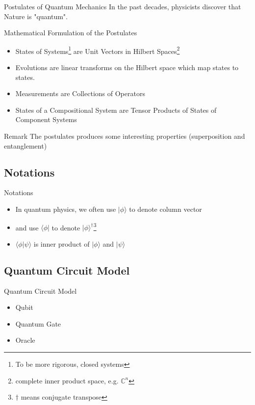 \documentclass{beamer}
\newcommand{\<}{\langle}
\renewcommand{\>}{\rangle}
\begin{document}
\begin{frame}{Postulates of Quantum Mechanics}
In the past decades, physicists discover that Nature is "quantum".

    \begin{block}{Mathematical Formulation of the Postulates}
        \begin{itemize}
            \item States of Systems\footnote[frame]{To be more rigorous, closed systems} are Unit Vectors in Hilbert Spaces\footnote[frame]{complete inner product space, e.g. $\mathbb{C}^n$}
            \item Evolutions are linear transforms on the Hilbert space which map states to states.
            \item Measurements are Collections of Operators
            \item States of a Compositional System are Tensor Products of States of Component Systems
        \end{itemize}
    \end{block}

    \begin{exampleblock}{Remark}
        The postulates produces some interesting properties (superposition and entanglement)
    \end{exampleblock}


\end{frame}

\subsection{Notations}
\begin{frame}{Notations}

\begin{itemize}
    \item  In quantum physics, we often use $|\phi\>$ to denote column vector
    \item and use $\<\phi|$ to denote $|\phi\>^\dagger$\footnote{$\dag$ means conjugate transpose}
    \item $\<\phi|\psi\>$ is inner product of $|\phi\>$ and $|\psi\>$
    
\end{itemize}

\end{frame}

\subsection{Quantum Circuit Model}
\begin{frame}{Quantum Circuit Model}

\begin{itemize}
    \item Qubit
    \item Quantum Gate
    \item Oracle
\end{itemize}

\end{frame}
\end{document}
